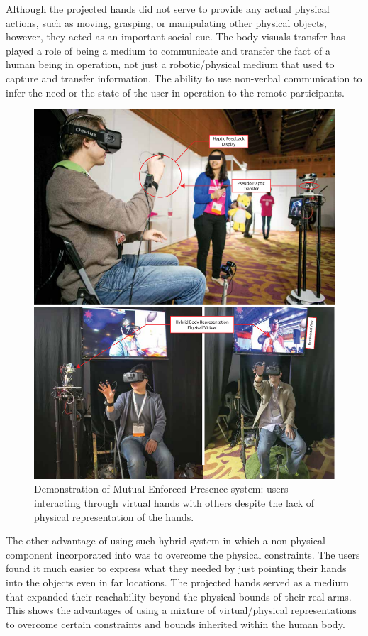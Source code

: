 Although the projected hands did not serve to provide any actual physical actions, such as moving, grasping, or manipulating other physical objects, however, they acted as an important social cue. The body visuals transfer has played a role of being a medium to communicate and transfer the fact of a human being in operation, not just a robotic/physical medium that used to capture and transfer information. The ability to use non-verbal communication to infer the need or the state of the user in operation to the remote participants. 

\begin{figure}[t!]
  \centering
  \captionsetup{justification=centering}
  \includegraphics[width=0.9\linewidth]{figures/eval/SIGGRAPH/ET_Siggraph.pdf}
  \par
  \caption{Demonstration of Mutual Enforced Presence system: users interacting through virtual hands with others despite the lack of physical representation of the hands.}
  \vspace*{\floatsep}
  \label{fig:ET-siggraph}
\end{figure}

The other advantage of using such hybrid system in which a non-physical component incorporated into was to overcome the physical constraints. The users found it much easier to express what they needed by just pointing their hands into the objects even in far locations. The projected hands served as a medium that expanded their reachability beyond the physical bounds of their real arms. This shows the advantages of using a mixture of virtual/physical representations to overcome certain constraints and bounds inherited within the human body.

